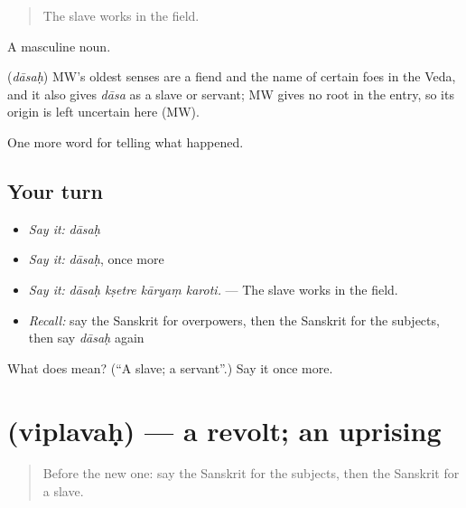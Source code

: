 \begin{quote}
The slave works in the field.
\end{quote}

A masculine noun.

\begin{cousinweb}
\textbf{} (\emph{dāsaḥ}) MW's oldest senses are a fiend and the name of certain foes in the Veda, and it also gives \emph{dāsa} as a slave or servant; MW gives no root in the entry, so its origin is left uncertain here (MW).
\end{cousinweb}

\begin{grammarlens}[title={What you've built}]
One more word for telling what happened.
\end{grammarlens}

\subsection*{Your turn}
\begin{itemize}
\raggedright
  \item \emph{Say it:} \emph{dāsaḥ}
  \item \emph{Say it:} \emph{dāsaḥ}, once more
  \item \emph{Say it:} \emph{dāsaḥ kṣetre kāryaṃ karoti.} — The slave works in the field.
  \item \emph{Recall:} say the Sanskrit for overpowers, then the Sanskrit for the subjects, then say \emph{dāsaḥ} again
\end{itemize}

\begin{tcolorbox}[breakable,colback=teal!4,colframe=teal!35!black,title={Before you move on}]
What does  mean? (\textquotedblleft{}A slave; a servant\textquotedblright{}.) Say it once more.
\end{tcolorbox}
\section[\texorpdfstring{\sk{विप्लवः} (viplavaḥ)}{विप्लवः (viplavaḥ)}]{ (viplavaḥ) — a revolt; an uprising}

\label{lesson:SA-C320-viplavah}



\begin{quote}
Before the new one: say the Sanskrit for the subjects, then the Sanskrit for a slave.
\end{quote}


